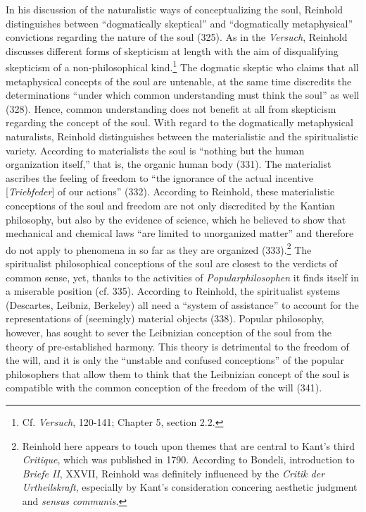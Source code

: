  In his discussion of the naturalistic ways of conceptualizing the soul, Reinhold distinguishes between ``dogmatically skeptical'' and ``dogmatically metaphysical'' convictions regarding the nature of the soul (325). As in the \textit{Versuch}, Reinhold discusses different forms of skepticism at length with the aim of disqualifying skepticism of a non{-}philosophical kind.\footnote{ Cf. \textit{Versuch}, 120{-}141; Chapter 5, section 2.2.} The dogmatic skeptic who claims that all metaphysical concepts of the soul are untenable, at the same time discredits the determinations ``under which common understanding must think the soul'' as well (328). Hence, common understanding does not benefit at all from skepticism regarding the concept of the soul. With regard to the dogmatically metaphysical naturalists, Reinhold distinguishes between the materialistic and the spiritualistic variety. According to materialists the soul is ``nothing but the human organization itself,'' that is, the organic human body (331). The materialist ascribes the feeling of freedom to ``the ignorance of the actual incentive [\textit{Triebfeder}] of our actions'' (332). According to Reinhold, these materialistic conceptions of the soul and freedom are not only discredited by the Kantian philosophy, but also by the evidence of science, which he believed to show that mechanical and chemical laws ``are limited to unorganized matter'' and therefore do not apply to phenomena in so far as they are organized (333).\footnote{ Reinhold here appears to touch upon themes that are central to Kant's third \textit{Critique}, which was published in 1790. According to Bondeli, introduction to \textit{Briefe II}, XXVII, Reinhold was definitely influenced by the \textit{Critik der Urtheilskraft}, especially by Kant's consideration concering aesthetic judgment and \textit{sensus communis.} } The spiritualist philosophical conceptions of the soul are closest to the verdicts of common sense, yet, thanks to the activities of \textit{Popularphilosophen} it finds itself in a miserable position (cf. 335). According to Reinhold, the spiritualist systems (Descartes, Leibniz, Berkeley) all need a ``system of assistance'' to account for the representations of (seemingly) material objects (338). Popular philosophy, however, has sought to sever the Leibnizian conception of the soul from the theory of pre{-}established harmony. This theory is detrimental to the freedom of the will, and it is only the ``unstable and confused conceptions'' of the popular philosophers that allow them to think that the Leibnizian concept of the soul is compatible with the common conception of the freedom of the will (341).

